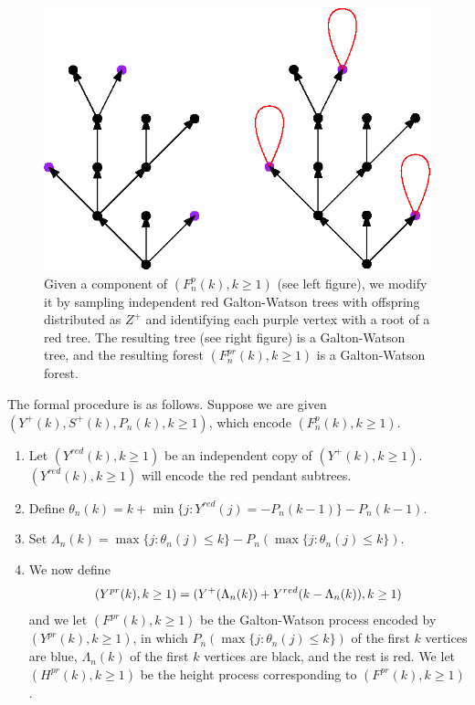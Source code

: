 \begin{figure}
    \centering
    \includegraphics[scale=0.6]{Content/Pictures/black_purple_red_tree.eps}
    \caption{Given a component of $(F^p_n(k),k\geq 1)$ (see left figure), we modify it by sampling independent red Galton-Watson trees with offspring distributed as $Z^+$ and identifying each purple vertex with a root of a red tree. The resulting tree (see right figure) is a Galton-Watson tree, and the resulting forest $(F^{pr}_n(k),k\geq 1)$ is a Galton-Watson forest.}
    \label{fig.blackpurpleredforest}
\end{figure}
The formal procedure is as follows. Suppose we are given $(Y^+(k),S^{+}(k),P_n(k),k\geq 1)$, which encode $(F^p_n(k),k\geq 1)$.
\begin{enumerate}
    \item Let $(Y^{red}(k),k\geq 1)$ be an independent copy of $(Y^+(k),k\geq 1)$. $(Y^{red}(k),k\geq 1)$ will encode the red pendant subtrees. 
    \item Define $\theta_n(k)=k+\min\{j: Y^{red}(j)=-P_n(k-1)\}-P_n(k-1)$. 
    \item Set $\Lambda_n(k)=\max\{j:\theta_n(j)\leq k\}-P_n(\max\{j:\theta_n(j)\leq k\})$. 
    \item We now define \begin{equation}\label{eq.definitionY^{pr}}(Y^{pr}(k),k\geq 1)=(Y^+(\Lambda_n(k))+Y^{red}(k-\Lambda_n(k)),k\geq 1)\end{equation}
    and we let $(F^{pr}(k),k\geq 1)$ be the Galton-Watson process encoded by $(Y^{pr}(k),k\geq 1)$, in which $P_n(\max\{j:\theta_n(j)\leq k\})$ of the first $k$ vertices are blue, $\Lambda_n(k)$ of the first $k$ vertices are black, and the rest is red. We let $(H^{pr}(k),k\geq 1)$ be the height process corresponding to $(F^{pr}(k),k\geq 1)$.
\end{enumerate}
